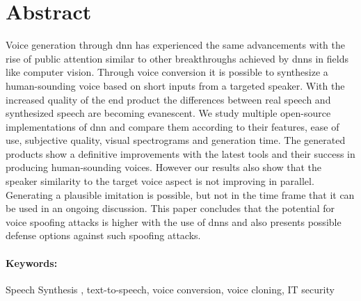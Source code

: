 
\newpage
\section*{Abstract}

Voice generation through \gls{dnn} has experienced the same advancements with the rise of public attention similar to other breakthroughs achieved by \gls{dnn}s in fields like computer vision. Through voice conversion it is possible to synthesize a human-sounding voice based on short inputs from a targeted speaker. With the increased quality of the end product the differences between real speech and synthesized speech are becoming evanescent.
We study multiple open-source implementations of \gls{dnn} and compare them according to their features, ease of use, subjective quality, visual spectrograms and generation time.
The generated products show a definitive improvements with the latest tools and their success in producing human-sounding voices. However our results also show that the speaker similarity to the target voice aspect is not improving in parallel. Generating a plausible imitation is possible, but not in the time frame that it can be used in an ongoing discussion. This paper concludes that the potential for voice spoofing attacks is higher with the use of \gls{dnn}s and also presents possible defense options against such spoofing attacks.

\paragraph{Keywords:}
Speech Synthesis , text-to-speech, voice conversion, voice cloning, IT security

\clearpage